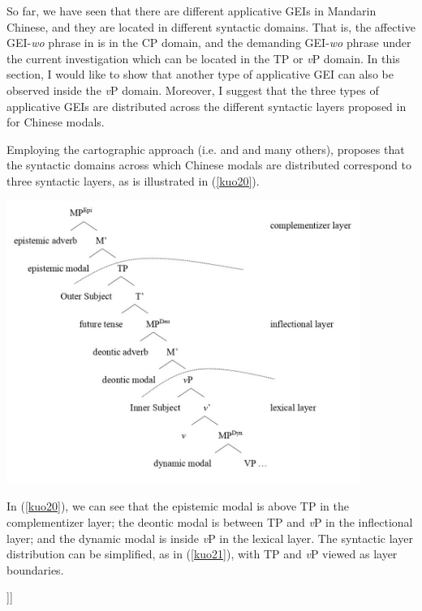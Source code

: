 \documentclass[output=paper,colorlinks,citecolor=brown]{langscibook}
\begin{document}
So far, we have seen that there are different applicative GEIs in Mandarin Chinese, and they are located in different syntactic domains. That is, the affective GEI-\textit{wo} phrase in \citet{Tsai2017} is in the CP domain, and the demanding GEI-\textit{wo} phrase under the current investigation which can be located in the TP or \textit{v}P domain. In this section, I would like to show that another type of applicative GEI can also be observed inside the \textit{v}P domain. Moreover, I suggest that the three types of applicative GEIs are distributed across the different syntactic layers proposed in \citet{Tsai2015a} for Chinese modals.\par
Employing the cartographic approach (i.e. \citealt{rizzi1997} and \citealt{cinque1999} and many others), \citet{Tsai2015a} proposes that the syntactic domains across which Chinese modals are distributed correspond to three syntactic layers, as is illustrated in (\ref{kuo20}).

\ea
\label{kuo20}
\includegraphics[align=t,width=11.5cm]{figures/tree2.jpg}
\z

In (\ref{kuo20}), we can see that the epistemic modal is above TP in the complementizer layer; the deontic modal is between TP and \textit{v}P in the inflectional layer; and the dynamic modal is inside \textit{v}P in the lexical layer. The syntactic layer distribution can be simplified, as in (\ref{kuo21}), with TP and \textit{v}P viewed as layer boundaries.

\ea
\label{kuo21}
\glt    [ complementizer layer  [{\scriptsize TP}    inflectional layer  [{\scriptsize \textit{v}P}   lexical layer .....]]]\\  
\z
\end{document}

